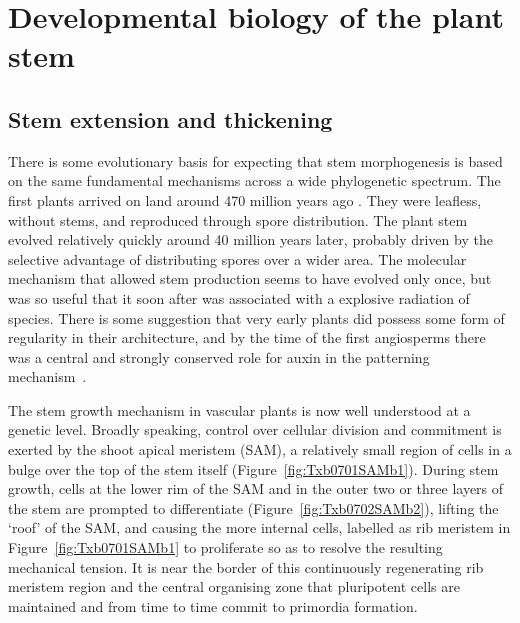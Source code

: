\chapter[Developmental biology of the plant]{Developmental biology of the plant stem}
\label{ch:developmental}
\label{sec:bio}
\section{Stem extension and thickening}
There is some evolutionary basis for expecting that stem morphogenesis is 
based on the same fundamental mechanisms across a wide phylogenetic spectrum.
The first plants arrived on land around 470 million years ago \cite{ingrouillePlantsDiversityEvolution2006,harrisonOriginEarlyEvolution2018}. They were leafless, without stems, and reproduced through spore distribution. The plant stem evolved relatively quickly around 40 million years later, probably driven by the selective advantage of distributing spores over a wider area.
The molecular mechanism that allowed stem production seems to have evolved only once, but was so useful that it soon after was associated with a explosive radiation of species. There is some suggestion that very early plants did possess some form of regularity in their architecture, and by the time of the first angiosperms there was a central and strongly conserved role for auxin in the patterning mechanism~\cite{reinhardtLawOrderPlants2022}. 

The stem growth mechanism in vascular plants is now well understood at a genetic level. Broadly speaking, control over cellular division and commitment is exerted by the shoot apical meristem (SAM), a relatively small region of cells in a bulge over the top of the stem itself (Figure~\ref{fig:Txb0701SAMb1}). During stem growth, cells at the lower rim of the SAM and in the outer two or three layers of the stem are prompted to differentiate (Figure~\ref{fig:Txb0702SAMb2}), lifting the `roof' of the SAM, and causing the more internal cells, labelled as rib meristem in Figure~\ref{fig:Txb0701SAMb1} to proliferate so as to resolve the resulting mechanical tension. It is near the border of this continuously regenerating rib meristem region and the central organising zone that pluripotent cells are maintained and from time to time commit to primordia formation. 

